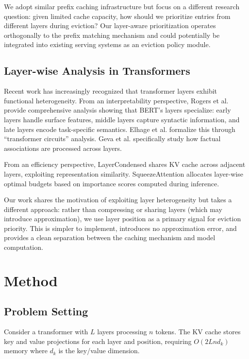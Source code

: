 \documentclass[10pt,conference]{IEEEtran}
\begin{document}
We adopt similar prefix caching infrastructure but focus on a different research question: given limited cache capacity, how should we prioritize entries from different layers during eviction? Our layer-aware prioritization operates orthogonally to the prefix matching mechanism and could potentially be integrated into existing serving systems as an eviction policy module.

\subsection{Layer-wise Analysis in Transformers}

Recent work has increasingly recognized that transformer layers exhibit functional heterogeneity. From an interpretability perspective, Rogers et al. \cite{rogers2020primer} provide comprehensive analysis showing that BERT's layers specialize: early layers handle surface features, middle layers capture syntactic information, and late layers encode task-specific semantics. Elhage et al. \cite{elhage2021mathematical} formalize this through ``transformer circuits'' analysis. Geva et al. \cite{geva2023dissecting} specifically study how factual associations are processed across layers.

From an efficiency perspective, LayerCondensed \cite{layercondensed2024} shares KV cache across adjacent layers, exploiting representation similarity. SqueezeAttention \cite{squeezeattention2025} allocates layer-wise optimal budgets based on importance scores computed during inference.

Our work shares the motivation of exploiting layer heterogeneity but takes a different approach: rather than compressing or sharing layers (which may introduce approximation), we use layer position as a primary signal for eviction priority. This is simpler to implement, introduces no approximation error, and provides a clean separation between the caching mechanism and model computation.

\section{Method}

\subsection{Problem Setting}

Consider a transformer with $L$ layers processing $n$ tokens. The KV cache stores key and value projections for each layer and position, requiring $O(2Lnd_k)$ memory where $d_k$ is the key/value dimension.
\end{document}
